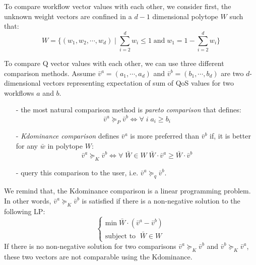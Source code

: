 \documentclass[10pt,journal,compsoc]{IEEEtran}
\begin{document}
To compare workflow vector values with each other, we consider first, the unknown weight vectors are confined in a $d-1$ dimensional polytope $W$ such that:
\begin{equation}
W = \{ (w_1, w_2, \cdots, w_d) \; | \; \sum_{i=2}^d w_i \leq 1 \; \text{and} \; w_1 = 1-\sum_{i=2}^d w_i \}
\end{equation}

To compare Q vector values with each other, we can use three different comparison methods. Assume $\bar{v}^a = (a_1, \cdots, a_d)$  and $\bar{v}^b = (b_1, \cdots, b_d)$ are two $d$-dimensional vectors representing expectation of sum of QoS values for two workflows $a$ and $b$. 

\begin{itemize}
\item[-] the most natural comparison method is \emph{pareto comparison} that defines:
\begin{equation} \label{eq:pareto}
\bar{v}^a \succeq_P \bar{v}^b \Leftrightarrow \forall \; i \; a_i \geq b_i
\end{equation}\label{eq:kdom}
\item[-] \emph{Kdominance comparison} defines $\bar{v}^a$ is more preferred than $\bar{v}^b$ if, it is better for any $\bar{w}$ in polytope $W$:
\begin{equation}
\bar{v}^a \succeq_K \bar{v}^b \Leftrightarrow \forall \; \bar{W} \in W \; \bar{W} \cdot \bar{v}^a \geq \bar{W} \cdot \bar{v}^b
\end{equation}\label{eq:queryuser}
\item[-] query this comparison to the user, i.e. $\bar{v}^a  \succeq_q \bar{v}^b$. 
\end{itemize} 

We remind that, the Kdominance comparison is a linear programming problem. In other words, $\bar{v}^a  \succeq_K \bar{v}^b$ is satisfied if there is a non-negative solution to the following LP:
\begin{equation}
\left\{
\begin{array}{ll}
\text{min} \; \bar{W} \cdot (\bar{v}^a - \bar{v}^b) \\
\text{subject to } \; \bar{W} \in W
\end{array}
\right.
\end{equation}
If there is no non-negative solution for two comparisons $\bar{v}^a  \succeq_K \bar{v}^b$ and $\bar{v}^b  \succeq_K \bar{v}^a$, these two vectors are not comparable using the Kdominance. \\
\end{document}
